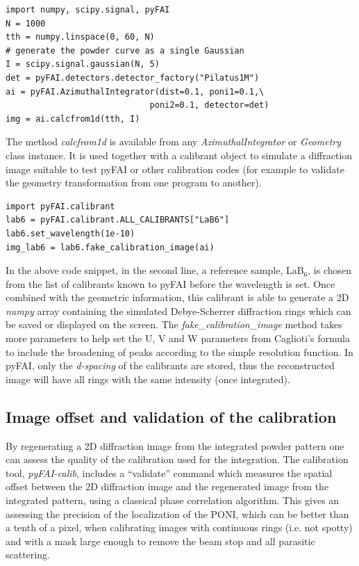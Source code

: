 \documentclass{iucr}
\begin{document}
\begin{verbatim}
import numpy, scipy.signal, pyFAI
N = 1000 
tth = numpy.linspace(0, 60, N)
# generate the powder curve as a single Gaussian
I = scipy.signal.gaussian(N, 5)
det = pyFAI.detectors.detector_factory("Pilatus1M")
ai = pyFAI.AzimuthalIntegrator(dist=0.1, poni1=0.1,\
                             poni2=0.1, detector=det)
img = ai.calcfrom1d(tth, I)
\end{verbatim}


The method \textit{calcfrom1d} is available from any
\textit{AzimuthalIntegrator} or \textit{Geometry} class instance.
It is used together with a calibrant object to simulate a diffraction
image suitable to test pyFAI or other calibration codes (for example to
validate the geometry transformation from one program to another).



\begin{verbatim}
import pyFAI.calibrant
lab6 = pyFAI.calibrant.ALL_CALIBRANTS["LaB6"]
lab6.set_wavelength(1e-10)
img_lab6 = lab6.fake_calibration_image(ai)
\end{verbatim}

In the above code snippet, in the second line, a reference sample,
LaB$_6$, is chosen from the list of calibrants known to pyFAI before the
wavelength is set.
Once combined with the geometric information, this calibrant is able to
generate a 2D \textit{numpy} array containing the simulated Debye-Scherrer
diffraction rings which can be saved or displayed on the screen.
The \textit{fake\_calibration\_image} method takes more parameters to help set
the U, V and W parameters from Caglioti's formula \cite{caglioti} to include the
broadening of peaks according to the simple resolution function.
In pyFAI, only the \textit{d-spacing} of the calibrants are stored, thus the
reconstructed image will have all rings with the same intensity (once integrated).

\subsection{Image offset and validation of the calibration}
By regenerating a 2D diffraction image from the integrated powder pattern one
can assess the quality of the calibration used for the integration.
The calibration tool, \textit{pyFAI-calib}, includes  a ``validate'' command
which measures the spatial offset between the 2D diffraction image and the
regenerated image from the integrated pattern, using a classical phase
correlation algorithm.
This gives an assessing the precision of the localization of the PONI, which
can be better than a tenth of a pixel, when calibrating images with continuous
rings (i.e. not spotty) and with a mask large enough to remove the beam stop and
all parasitic scattering.
\end{document}
